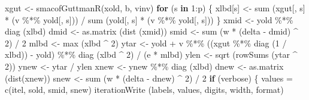 \documentclass[
  12pt,
]{book}
\newenvironment{Shaded}{\begin{snugshade}}{\end{snugshade}}
\newcommand{\ControlFlowTok}[1]{\textcolor[rgb]{0.13,0.29,0.53}{\textbf{#1}}}
\newcommand{\DecValTok}[1]{\textcolor[rgb]{0.00,0.00,0.81}{#1}}
\newcommand{\FunctionTok}[1]{\textcolor[rgb]{0.00,0.00,0.00}{#1}}
\newcommand{\NormalTok}[1]{#1}
\newcommand{\OtherTok}[1]{\textcolor[rgb]{0.56,0.35,0.01}{#1}}
\newcommand{\SpecialCharTok}[1]{\textcolor[rgb]{0.00,0.00,0.00}{#1}}
\theoremstyle{definition}
\theoremstyle{definition}
\theoremstyle{definition}
\theoremstyle{definition}
\theoremstyle{remark}
\begin{document}
\begin{Shaded}
\begin{Highlighting}[]
\NormalTok{      xgut }\OtherTok{\textless{}{-}} \FunctionTok{smacofGuttmanR}\NormalTok{(xold, b, vinv)}
      \ControlFlowTok{for}\NormalTok{ (s }\ControlFlowTok{in} \DecValTok{1}\SpecialCharTok{:}\NormalTok{p) \{}
\NormalTok{        xlbd[s] }\OtherTok{\textless{}{-}}
          \FunctionTok{sum}\NormalTok{ (xgut[, s] }\SpecialCharTok{*}\NormalTok{ (v }\SpecialCharTok{\%*\%}\NormalTok{ yold[, s])) }\SpecialCharTok{/} \FunctionTok{sum}\NormalTok{ (yold[, s] }\SpecialCharTok{*}\NormalTok{ (v }\SpecialCharTok{\%*\%}\NormalTok{ yold[, s]))}
\NormalTok{      \}}
\NormalTok{      xmid }\OtherTok{\textless{}{-}}\NormalTok{ yold }\SpecialCharTok{\%*\%} \FunctionTok{diag}\NormalTok{ (xlbd)}
\NormalTok{      dmid }\OtherTok{\textless{}{-}} \FunctionTok{as.matrix}\NormalTok{ (}\FunctionTok{dist}\NormalTok{ (xmid))}
\NormalTok{      smid }\OtherTok{\textless{}{-}} \FunctionTok{sum}\NormalTok{ (w }\SpecialCharTok{*}\NormalTok{ (delta }\SpecialCharTok{{-}}\NormalTok{ dmid) }\SpecialCharTok{\^{}} \DecValTok{2}\NormalTok{) }\SpecialCharTok{/} \DecValTok{2}
\NormalTok{      mlbd }\OtherTok{\textless{}{-}} \FunctionTok{max}\NormalTok{ (xlbd }\SpecialCharTok{\^{}} \DecValTok{2}\NormalTok{)}
\NormalTok{      ytar }\OtherTok{\textless{}{-}}
\NormalTok{        yold }\SpecialCharTok{+}\NormalTok{ v }\SpecialCharTok{\%*\%}\NormalTok{ ((xgut }\SpecialCharTok{\%*\%} \FunctionTok{diag}\NormalTok{ (}\DecValTok{1} \SpecialCharTok{/}\NormalTok{ xlbd)) }\SpecialCharTok{{-}}\NormalTok{ yold) }\SpecialCharTok{\%*\%} \FunctionTok{diag}\NormalTok{ (xlbd }\SpecialCharTok{\^{}} \DecValTok{2}\NormalTok{) }\SpecialCharTok{/}\NormalTok{ (e }\SpecialCharTok{*}\NormalTok{ mlbd)}
\NormalTok{      ylen }\OtherTok{\textless{}{-}} \FunctionTok{sqrt}\NormalTok{ (}\FunctionTok{rowSums}\NormalTok{ (ytar }\SpecialCharTok{\^{}} \DecValTok{2}\NormalTok{))}
\NormalTok{      ynew }\OtherTok{\textless{}{-}}\NormalTok{ ytar }\SpecialCharTok{/}\NormalTok{ ylen}
\NormalTok{      xnew }\OtherTok{\textless{}{-}}\NormalTok{ ynew }\SpecialCharTok{\%*\%} \FunctionTok{diag}\NormalTok{ (xlbd)}
\NormalTok{      dnew }\OtherTok{\textless{}{-}} \FunctionTok{as.matrix}\NormalTok{ (}\FunctionTok{dist}\NormalTok{(xnew))}
\NormalTok{      snew }\OtherTok{\textless{}{-}} \FunctionTok{sum}\NormalTok{ (w }\SpecialCharTok{*}\NormalTok{ (delta }\SpecialCharTok{{-}}\NormalTok{ dnew) }\SpecialCharTok{\^{}} \DecValTok{2}\NormalTok{) }\SpecialCharTok{/} \DecValTok{2}
      \ControlFlowTok{if}\NormalTok{ (verbose) \{}
\NormalTok{        values }\OtherTok{=} \FunctionTok{c}\NormalTok{(itel, sold, smid, snew)}
        \FunctionTok{iterationWrite}\NormalTok{ (labels, values, digits, width, format)}

\end{Highlighting}
\end{Shaded}
\end{document}
